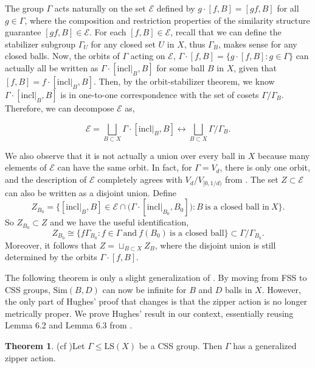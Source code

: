 \documentclass[12pt]{amsart}
\numberwithin{equation}{subsection}
\theoremstyle{definition}
\newtheorem{theorem}{Theorem}[section]
\theoremstyle{definition}
\theoremstyle{remark}
\begin{document}
The group $\Gamma$ acts naturally on the set $\mathcal{E}$ defined by $g \cdot [f,B] = [gf,B]$ for all $g \in \Gamma$, where the composition and restriction properties of the similarity structure guarantee $[gf,B] \in \mathcal E$. For each $[f,B] \in \mathcal E$, recall that we can define the stabilizer subgroup $\Gamma_U$ for any closed set $U$ in $X$, thus $\Gamma_B$, makes sense for any closed balls. Now, the orbits of $\Gamma$ acting on $\mathcal E$, $\Gamma \cdot [f,B] = \{g \cdot [f,B] : g\in \Gamma \}$ can actually all be written as $\Gamma \cdot [\text{incl}\vert_B, B]$ for some ball $B$ in $X$, given that $[f,B] = f \cdot [\text{incl}\vert_B, B]$. Then, by the orbit-stabilizer theorem, we know $\Gamma \cdot [\text{incl}\vert_B, B]$ is in one-to-one correspondence with the set of cosets $\Gamma / \Gamma_B$. Therefore, we can decompose $\mathcal E$ as,

\[ \mathcal{E} = \bigsqcup\limits_{B \subset X}\Gamma \cdot [\text{incl}\vert_B, B] \leftrightarrow  \bigsqcup\limits_{B \subset X} \Gamma / \Gamma_B.\]

We also observe that it is not actually a union over every ball in $X$ because many elements of $\mathcal E$ can have the same orbit. In fact, for $\Gamma = V_d$, there is only one orbit, and the description of $\mathcal E$ completely agrees with $V_d/V_{[0,1/d)}$ from \cite{farley2003proper}. The set $Z \subset \mathcal E$ can also be written as a disjoint union. Define $$Z_{B_0} = \{ [\text{incl}\vert_B, B] \in  \mathcal E \cap \big(\Gamma \cdot  [\text{incl}\vert_{B_0}, B_0] \big) : B \: \text{is a closed ball in} \: X\}.$$ So $Z_{B_0} \subset Z$ and we have the useful identification,
$$Z_{B_0} \cong \{f\Gamma_{B_0} : f\in \Gamma \: \text{and} \: f(B_0) \: \text{is a closed ball} \} \subset \Gamma / \Gamma_{B_0}.$$ 
Moreover, it follows that $Z = \sqcup_{B \subset X} Z_B$, where the disjoint union is still determined by the orbits $\Gamma \cdot [f,B]$.





The following theorem is only a slight generalization of \cite[Theorem 6.1]{hughes2009}. By moving from FSS to CSS groups,  $\text{Sim}(B,D)$ can now be infinite for $B$ and $D$ balls in $X$. However, the only part of Hughes' proof that changes is that the zipper action is no longer metrically proper. We prove Hughes' result in our context, essentially reusing Lemma 6.2 and Lemma 6.3 from \cite{hughes2009}.

\begin{theorem}(cf \cite[Theorem 6.1]{hughes2009})\label{thm:CssZipper}
     Let $\Gamma \leq \text{LS}(X)$ be a CSS group. Then $\Gamma$ has a generalized zipper action. 
\end{theorem}
\end{document}
